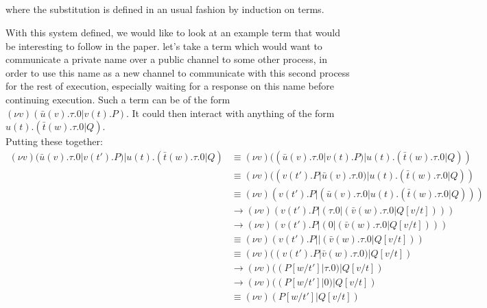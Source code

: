 \begin{definition}
\begin{prooftree}\end{prooftree}\hfill~\\~\\
\begin{prooftree}\end{prooftree}\hfill
\begin{prooftree}\end{prooftree}\hfill
\begin{prooftree}\end{prooftree}\\~\\
where the substitution is defined in an usual fashion by induction on terms.
\end{definition}

With this system defined, we would like to look at an example term that would be interesting to follow in the paper.
\example let's take a term which would want to communicate a private name over a public channel to some other process, in order to use this name as a new channel to communicate with this second process for the rest of execution, especially waiting for a response on this name before continuing execution. Such a term can be of the form $(\nu v)(\bar{u}(v).\tau.0|v(t).P)$. It could then interact with anything of the form $u(t).(\bar{t}(w).\tau.0|Q)$.\\
Putting these together:
\begin{align*}
(\nu v)(\bar{u}(v).\tau.0|v(t').P)|u(t).(\bar{t}(w).\tau.0|Q) &\equiv (\nu v)((\bar{u}(v).\tau.0|v(t).P)|u(t).(\bar{t}(w).\tau.0|Q))\\
&\equiv (\nu v)((v(t').P|\bar{u}(v).\tau.0)|u(t).(\bar{t}(w).\tau.0|Q))\\
&\equiv (\nu v)(v(t').P|(\bar{u}(v).\tau.0|u(t).(\bar{t}(w).\tau.0|Q)))\\
&\to (\nu v)(v(t').P|(\tau.0|(\bar{v}(w).\tau.0|Q[v/t])))\\
&\to (\nu v)(v(t').P|(0|(\bar{v}(w).\tau.0|Q[v/t])))\\
&\equiv (\nu v)(v(t').P||(\bar{v}(w).\tau.0|Q[v/t]))\\
&\equiv (\nu v)((v(t').P|\bar{v}(w).\tau.0)|Q[v/t])\\
&\to (\nu v)((P[w/t']|\tau.0)|Q[v/t])\\
&\to (\nu v)((P[w/t']|0)|Q[v/t])\\
&\equiv (\nu v)(P[w/t']|Q[v/t])
\end{align*}

